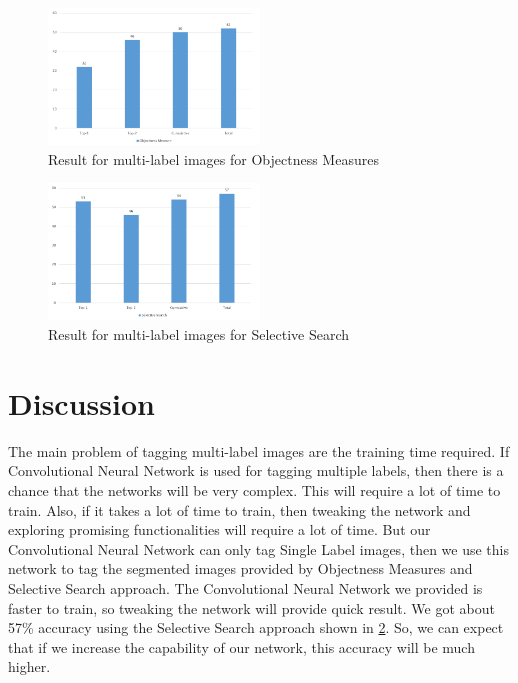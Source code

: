 \begin{figure}
  \centering
  \includegraphics[width=0.5\textwidth]{images/Capture3.PNG}
  \caption{Result for multi-label images for Objectness Measures}\label{finobj}
\end{figure}


\begin{figure}
  \centering
  \includegraphics[width=0.5\textwidth]{images/Capture4.PNG}
  \caption {Result for multi-label images for Selective Search}\label{finsel}
\end{figure}

\section{Discussion}

The main problem of tagging multi-label images are the training time required. If Convolutional Neural Network is used for tagging multiple labels, then there is a chance that the networks will be very complex. This will require a lot of time to train. Also, if it takes a lot of time to train, then tweaking the network and exploring promising functionalities will require a lot of time. But our Convolutional Neural Network can only tag Single Label images, then we use this network to tag the segmented images provided by Objectness Measures and Selective Search approach. The Convolutional Neural Network we provided is faster to train, so tweaking the network will provide quick result. We got about 57\% accuracy using the Selective Search approach shown in \ref{finsel}. So, we can expect that if we increase the capability of our network, this accuracy will be much higher.

